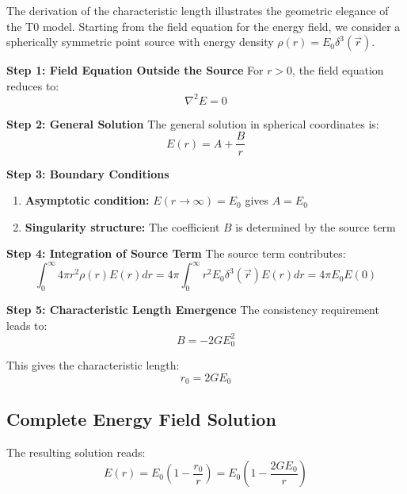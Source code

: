 \documentclass[12pt,a4paper]{report}
\newcommand{\rzero}{r_0}                  %
\begin{document}
	The derivation of the characteristic length illustrates the geometric elegance of the T0 model. Starting from the field equation for the energy field, we consider a spherically symmetric point source with energy density $\rho(r) = E_0 \delta^3(\vec{r})$.
	
	\textbf{Step 1: Field Equation Outside the Source}
	For $r > 0$, the field equation reduces to:
	\begin{equation}
		\nabla^2 E = 0
		\label{eq:laplace_outside}
	\end{equation}
	
	\textbf{Step 2: General Solution}
	The general solution in spherical coordinates is:
	\begin{equation}
		E(r) = A + \frac{B}{r}
		\label{eq:general_solution}
	\end{equation}
	
	\textbf{Step 3: Boundary Conditions}
	\begin{enumerate}
		\item \textbf{Asymptotic condition:} $E(r \to \infty) = E_0$ gives $A = E_0$
		\item \textbf{Singularity structure:} The coefficient $B$ is determined by the source term
	\end{enumerate}
	
	\textbf{Step 4: Integration of Source Term}
	The source term contributes:
	\begin{equation}
		\int_0^{\infty} 4\pi r^2 \rho(r) E(r) dr = 4\pi \int_0^{\infty} r^2 E_0 \delta^3(\vec{r}) E(r) dr = 4\pi E_0 E(0)
	\end{equation}
	
	\textbf{Step 5: Characteristic Length Emergence}
	The consistency requirement leads to:
	\begin{equation}
		B = -2GE_0^2
	\end{equation}
	
	This gives the characteristic length:
	\begin{equation}
		\boxed{\rzero = 2GE_0}
	\end{equation}
	
	\subsection{Complete Energy Field Solution}\label{subsec:complete_solution}
	
	The resulting solution reads:
	\begin{equation}
		\boxed{E(r) = E_0\left(1 - \frac{\rzero}{r}\right) = E_0\left(1 - \frac{2GE_0}{r}\right)}
		\label{eq:complete_energy_solution}
	\end{equation}
	
\end{document}
